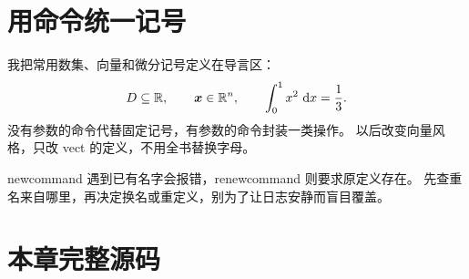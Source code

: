 \section{用命令统一记号}
我把常用数集、向量和微分记号定义在导言区：
\[
  D\subseteq\mathbb{R},\qquad\bm{x}\in\mathbb{R}^n,\qquad
  \int_0^1x^2\,\mathop{}\!\mathrm{d} x=\frac13.
\]
没有参数的命令代替固定记号，有参数的命令封装一类操作。
以后改变向量风格，只改 vect 的定义，不用全书替换字母。

newcommand 遇到已有名字会报错，renewcommand 则要求原定义存在。
先查重名来自哪里，再决定换名或重定义，别为了让日志安静而盲目覆盖。

\section*{本章完整源码}
